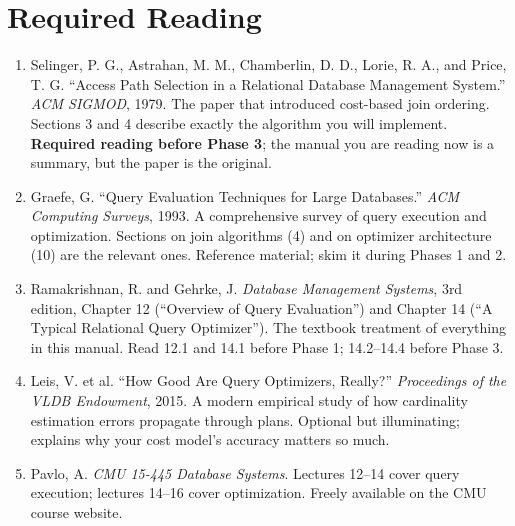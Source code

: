 \documentclass[11pt,a4paper]{article}
\begin{document}
\section{Required Reading}

\begin{enumerate}
\item Selinger, P. G., Astrahan, M. M., Chamberlin, D. D., Lorie, R. A., and Price, T. G. ``Access Path Selection in a Relational Database Management System.'' \textit{ACM SIGMOD}, 1979. The paper that introduced cost-based join ordering. Sections 3 and 4 describe exactly the algorithm you will implement. \textbf{Required reading before Phase 3}; the manual you are reading now is a summary, but the paper is the original.

\item Graefe, G. ``Query Evaluation Techniques for Large Databases.'' \textit{ACM Computing Surveys}, 1993. A comprehensive survey of query execution and optimization. Sections on join algorithms (4) and on optimizer architecture (10) are the relevant ones. Reference material; skim it during Phases 1 and 2.

\item Ramakrishnan, R. and Gehrke, J. \textit{Database Management Systems}, 3rd edition, Chapter 12 (``Overview of Query Evaluation'') and Chapter 14 (``A Typical Relational Query Optimizer''). The textbook treatment of everything in this manual. Read 12.1 and 14.1 before Phase 1; 14.2--14.4 before Phase 3.

\item Leis, V. et al. ``How Good Are Query Optimizers, Really?'' \textit{Proceedings of the VLDB Endowment}, 2015. A modern empirical study of how cardinality estimation errors propagate through plans. Optional but illuminating; explains why your cost model's accuracy matters so much.

\item Pavlo, A. \textit{CMU 15-445 Database Systems}. Lectures 12--14 cover query execution; lectures 14--16 cover optimization. Freely available on the CMU course website.
\end{enumerate}

\footerboxes
\end{document}
